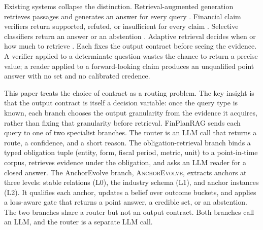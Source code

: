 \documentclass[11pt]{article}
\newcommand{\method}{FinPlanRAG}
\newcommand{\anchor}{\textsc{AnchorEvolve}}
\begin{document}
Existing systems collapse the distinction. Retrieval-augmented generation retrieves passages and generates an answer for every query \citep{lewis2020rag}. Financial claim verifiers return supported, refuted, or insufficient for every claim \citep{zhao2024findver,rangapur2025finfact}. Selective classifiers return an answer or an abstention \citep{chow1970optimum,geifman2017selective}. Adaptive retrieval decides when or how much to retrieve \citep{jiang2023flare,jeong2024adaptiverag}. Each fixes the output contract before seeing the evidence. A verifier applied to a determinate question wastes the chance to return a precise value; a reader applied to a forward-looking claim produces an unqualified point answer with no set and no calibrated credence.

This paper treats the choice of contract as a routing problem. The key insight is that the output contract is itself a decision variable: once the query type is known, each branch chooses the output granularity from the evidence it acquires, rather than fixing that granularity before retrieval. \method{} sends each query to one of two specialist branches. The router is an LLM call that returns a route, a confidence, and a short reason. The obligation-retrieval branch binds a typed obligation tuple (entity, form, fiscal period, metric, unit) to a point-in-time corpus, retrieves evidence under the obligation, and asks an LLM reader for a closed answer. The AnchorEvolve branch, \anchor, extracts anchors at three levels: stable relations (L0), the industry schema (L1), and anchor instances (L2). It qualifies each anchor, updates a belief over outcome buckets, and applies a loss-aware gate that returns a point answer, a credible set, or an abstention. The two branches share a router but not an output contract. Both branches call an LLM, and the router is a separate LLM call.
\end{document}
